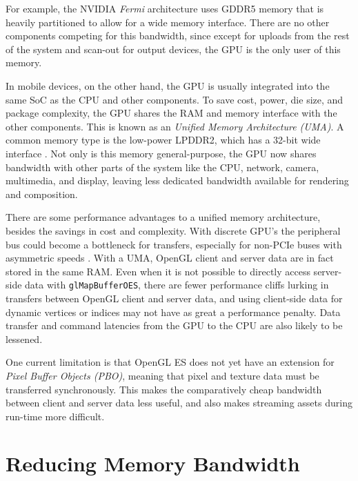For example, the NVIDIA \textit{Fermi} architecture uses GDDR5 memory that is
heavily partitioned \cite{Walton10} to allow for a wide memory interface.
There are no other components competing for this bandwidth, since except for
uploads from the rest of the system and scan-out for output devices, the GPU is
the only user of this memory.

 

In mobile devices, on the other hand, the GPU is usually integrated into the
same SoC as the CPU and other components.  To save cost, power, die size, and
package complexity, the GPU shares the RAM and memory interface with the other
components.  This is known as an \textit{Unified Memory Architecture (UMA)}.  A
common memory type is the low-power LPDDR2, which has a 32-bit wide
interface \cite{Klug11b}.  Not only is this memory general-purpose, the GPU now
shares bandwidth with other parts of the system like the CPU, network, camera,
multimedia, and display, leaving less dedicated bandwidth available for
rendering and composition.


There are some performance advantages to a unified memory architecture, besides
the savings in cost and complexity.  With discrete GPU's the peripheral bus
could become a bottleneck for transfers, especially for non-PCIe buses with
asymmetric speeds \cite{Elhasson05}.  With a UMA, OpenGL client and server data
are in fact stored in the same RAM.  Even when it is not possible to directly
access server-side data with \texttt{glMapBufferOES}, there are fewer
performance cliffs lurking in transfers between OpenGL client and server data,
and using client-side data for dynamic vertices or indices may not have as
great a performance penalty.  Data transfer and command latencies from the GPU to the
CPU are also likely to be lessened.


One current limitation is that OpenGL ES does not yet have an extension for
\textit{Pixel Buffer Objects (PBO)}, meaning that pixel and texture data must
be transferred synchronously.  This makes the comparatively cheap bandwidth
between client and server data less useful, and also makes streaming assets
during run-time more difficult.

\section{Reducing Memory
Bandwidth}\label{Jon-McCaffrey:Reducing-Memory-Bandwidth}

